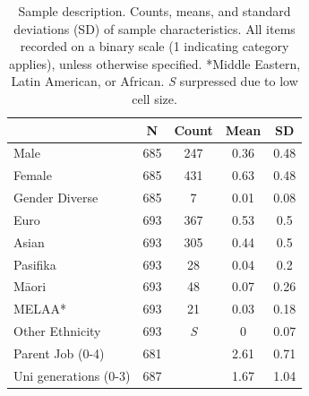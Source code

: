 \begin{table}[ht]
\centering

\label{tab:Sample}       %
\begin{tabular}{lcccc}
\hline
                                                             & N   & Count & Mean & SD   \\ \hline
Male                                                         & 685 & 247 & 0.36 & 0.48 \\
Female                                                       & 685 & 431 & 0.63 & 0.48 \\
Gender Diverse                                               & 685 & 7 & 0.01 & 0.08 \\
Euro                                                         & 693 & 367 & 0.53 & 0.5  \\
Asian                                                        & 693 & 305 & 0.44 & 0.5  \\
Pasifika                                                      & 693 & 28 & 0.04 & 0.2  \\
M\={a}ori                                                        & 693 & 48 & 0.07 & 0.26 \\
MELAA*                                                        & 693 & 21 & 0.03 & 0.18 \\
Other Ethnicity                                               & 693 & \textit{S} & 0  & 0.07 \\
Parent Job  (0-4) &  681 & & 2.61 & 0.71 \\
Uni generations (0-3)                                        & 687 & & 1.67 & 1.04 \\ \hline
\end{tabular}
\caption{Sample description. Counts, means, and standard deviations (SD) of sample characteristics. All items recorded on a binary scale (1 indicating category applies), unless otherwise specified. *Middle Eastern, Latin American, or African. \textit{S} surpressed due to low cell size.} 
\end{table}

